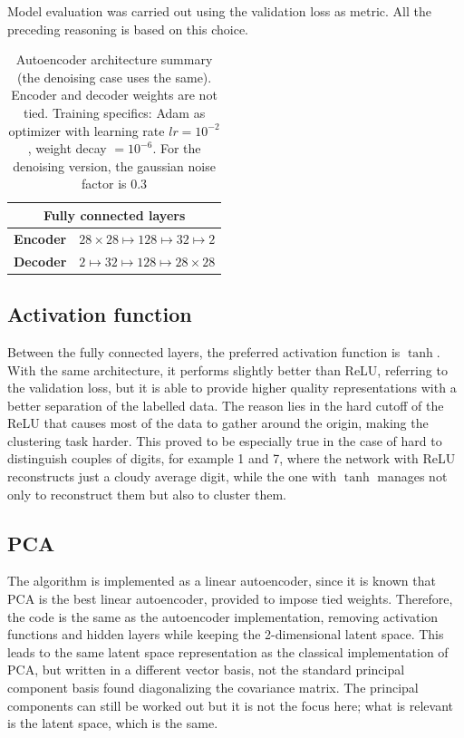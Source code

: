 \documentclass[twocolumn,gsifonts,twoside]{gsipaper}
\begin{document}
Model evaluation was carried out using the validation loss as metric. All the preceding reasoning is based on this choice.

\begin{table}
  \centering
  \begin{tabular}{c c}
    \toprule
    \multicolumn{2}{c}{Fully connected layers} \\ 
    \midrule
    \textbf{Encoder} & $28\times28 \mapsto 128 \mapsto 32 \mapsto 2$ \\
    \textbf{Decoder} & $2 \mapsto 32 \mapsto 128 \mapsto 28\times28$ \\
    \bottomrule
  \end{tabular}
  \caption{Autoencoder architecture summary (the denoising case uses the same). Encoder and decoder weights are not tied. Training specifics: Adam as optimizer with learning rate $lr=10^{-2}$, weight decay $=10^{-6}$. For the denoising version, the gaussian noise factor is 0.3}
  \label{tab:architecture}
\end{table}


\subsection{Activation function}
Between the fully connected layers, the preferred activation function is $\tanh$. With the same architecture, it performs slightly better than ReLU, referring to the validation loss, but it is able to provide higher quality representations with a better separation of the labelled data. The reason lies in the hard cutoff of the ReLU that causes most of the data to gather around the origin, making the clustering task harder. This proved to be especially true in the case of hard to distinguish couples of digits, for example 1 and 7, where the network with ReLU reconstructs just a cloudy average digit, while the one with $\tanh$ manages not only to reconstruct them but also to cluster them.

\subsection{PCA}
The algorithm is implemented as a linear autoencoder, since it is known that PCA is the best linear autoencoder, provided to impose tied weights. Therefore, the code is the same as the autoencoder implementation, removing activation functions and hidden layers while keeping the 2-dimensional latent space. This leads to the same latent space representation as the classical implementation of PCA, but written in a different vector basis, not the standard principal component basis found diagonalizing the covariance matrix. The principal components can still be worked out \cite{Plaut2018} but it is not the focus here; what is relevant is the latent space, which is the same.
\end{document}
